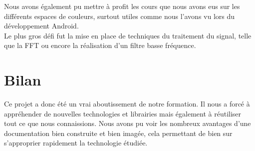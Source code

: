 Nous avons également pu mettre à profit les cours que nous avons eus sur les différents espaces de couleurs, surtout utiles comme nous l'avons vu lors du développement Android.\\
Le plus gros défi fut la mise en place de techniques du traitement du signal, telle que la FFT ou encore la réalisation d'un filtre basse fréquence.

\section{Bilan}

Ce projet a donc été un vrai aboutissement de notre formation. Il nous a forcé à appréhender de nouvelles technologies et librairies mais également à réutiliser tout ce que nous
 connaissions. Nous avons pu voir les nombreux avantages d'une documentation bien construite et bien imagée, cela permettant de bien sur s'approprier rapidement la technologie étudiée.
